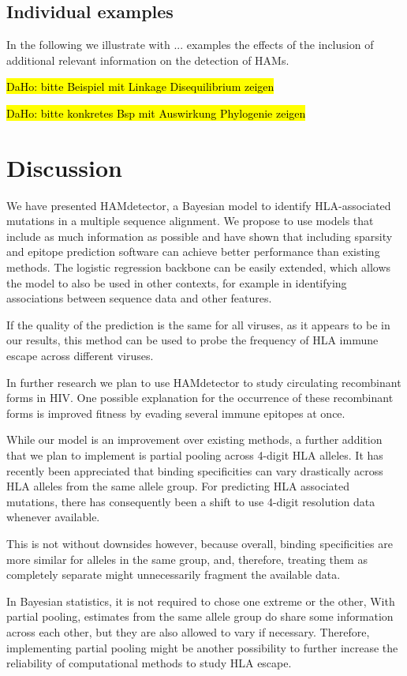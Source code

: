 \documentclass{bioinfo}
\begin{document}
 \subsection{Individual examples}
In the following we illustrate with ... examples the effects of the inclusion of additional relevant information on the detection of HAMs.
 
 \hl{DaHo: bitte Beispiel mit Linkage Disequilibrium zeigen}

\hl{DaHo: bitte konkretes Bsp mit Auswirkung Phylogenie zeigen}

\section{Discussion}

We have presented HAMdetector, a Bayesian model to identify HLA-associated mutations in a multiple sequence alignment. We propose to use models that include as much information as possible and have shown that including sparsity and epitope prediction software can achieve better performance than existing methods. The logistic regression backbone can be easily extended, which allows the model to also be used in other contexts, for example in identifying associations between sequence data and other features.

If the quality of the prediction is the same for all viruses, as it appears to be in our results, this method can be used to probe the frequency of HLA immune escape across different viruses.

In further research we plan to use HAMdetector to study circulating recombinant forms in HIV. One possible explanation for the occurrence of these recombinant forms is improved fitness by evading several immune epitopes at once.

While our model is an improvement over existing methods, a further addition that we plan to implement is partial pooling across 4-digit HLA alleles. It has recently been appreciated that binding specificities can vary drastically across  HLA alleles from the same allele group. For predicting HLA associated mutations, there has consequently been a shift to use 4-digit resolution data whenever available. 

This is not without downsides however, because overall, binding specificities are more similar for alleles in the same group, and, therefore, treating them as completely separate might unnecessarily fragment the available data.

In Bayesian statistics, it is not required to chose one extreme or the other, With partial pooling, estimates from the same allele group do share some information across each other, but they are also allowed to vary if necessary.
Therefore, implementing partial pooling might be another possibility to further increase the reliability of computational methods to study HLA escape.
\end{document}
